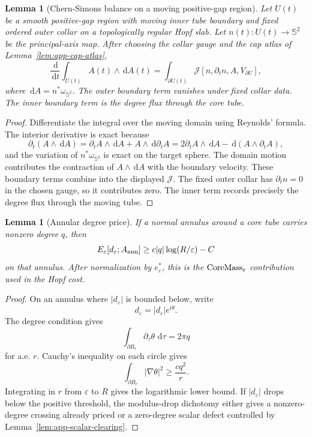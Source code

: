 \documentclass[11pt]{article}
\newtheorem{lemma}[theorem]{Lemma}
\theoremstyle{definition}
\newcommand{\Sph}{\mathbb S}
\newcommand{\dd}{\,\mathrm d}
\newcommand{\eps}{\varepsilon}
\newcommand{\estar}{e_\varepsilon^\ast}
\begin{document}
\begin{lemma}[Chern-Simons balance on a moving positive-gap region]
\label{lem:app-cs-balance}
Let \(U(t)\) be a smooth positive-gap region with moving inner tube boundary and
fixed ordered outer collar on a topologically regular Hopf slab.  Let
\(n(t):U(t)\to\Sph^2\) be the principal-axis map.  After choosing the collar
gauge and the cap atlas of Lemma~\ref{lem:app-cap-atlas},
\[
        \frac{\dd}{\dd t}
        \int_{U(t)}A(t)\wedge \dd A(t)
        =
        \int_{\partial U(t)}
        \mathcal J[n,\partial_tn,A,V_{\partial U}],
\]
where \(\dd A=n^\ast\omega_{\Sph^2}\).  The outer boundary term vanishes under
fixed collar data.  The inner boundary term is the degree flux through the
core tube.
\end{lemma}

\begin{proof}
Differentiate the integral over the moving domain using Reynolds' formula.
The interior derivative is exact because
\[
        \partial_t(A\wedge\dd A)
        =
        \partial_tA\wedge\dd A
        +
        A\wedge\dd\partial_tA
        =
        2\partial_tA\wedge\dd A
        -
        \dd(A\wedge\partial_tA),
\]
and the variation of \(n^\ast\omega_{\Sph^2}\) is exact on the target sphere.
The domain motion contributes the contraction of \(A\wedge\dd A\) with the
boundary velocity.  These boundary terms combine into the displayed
\(\mathcal J\).  The fixed outer collar has \(\partial_tn=0\) in the chosen
gauge, so it contributes zero.  The inner term records precisely the degree
flux through the moving tube.
\end{proof}

\begin{lemma}[Annular degree price]
\label{lem:app-annular-price}
If a normal annulus around a core tube carries nonzero degree \(q\), then
\[
        E_\eps[d_\eps;A_{\rm ann}]
        \ge
        c|q|\log(R/\eps)-C
\]
on that annulus.  After normalization by \(\estar\), this is the
\({\rm CoreMass}_\eps\) contribution used in the Hopf cost.
\end{lemma}

\begin{proof}
On an annulus where \(|d_\eps|\) is bounded below, write
\[
        d_\eps=|d_\eps|e^{i\theta}.
\]
The degree condition gives
\[
        \int_{\partial B_r}\partial_\tau\theta\,\dd\tau=2\pi q
\]
for a.e. \(r\).  Cauchy's inequality on each circle gives
\[
        \int_{\partial B_r}|\nabla\theta|^2
        \ge
        \frac{c q^2}{r}.
\]
Integrating in \(r\) from \(\eps\) to \(R\) gives the logarithmic lower bound.
If \(|d_\eps|\) drops below the positive threshold, the modulus-drop
dichotomy either gives a nonzero-degree crossing already priced or a
zero-degree scalar defect controlled by Lemma~\ref{lem:app-scalar-clearing}.
\end{proof}
\end{document}
